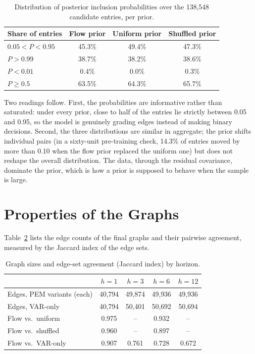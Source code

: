 \documentclass[MTech]{ugthesis}
\begin{document}
\begin{table}[htpb]
\small
\renewcommand{\arraystretch}{1.4}
\centering
\caption{Distribution of posterior inclusion probabilities over the 138,548 candidate entries, per prior.}
\label{tab:pstats}
\begin{tabular}{|p{4.2cm}|c|c|c|}
\hline
Share of entries & Flow prior & Uniform prior & Shuffled prior \\ \hline
$0.05 < P < 0.95$ & 45.3\% & 49.4\% & 47.3\% \\ \hline
$P > 0.99$ & 38.7\% & 38.2\% & 38.6\% \\ \hline
$P < 0.01$ & 0.4\% & 0.0\% & 0.3\% \\ \hline
$P \ge 0.5$ & 63.5\% & 64.3\% & 65.7\% \\ \hline
\end{tabular}
\end{table}

Two readings follow. First, the probabilities are informative rather than saturated: under every prior, close to half of the entries lie strictly between 0.05 and 0.95, so the model is genuinely grading edges instead of making binary decisions. Second, the three distributions are similar in aggregate; the prior shifts individual pairs (in a sixty-unit pre-training check, 14.3\% of entries moved by more than 0.10 when the flow prior replaced the uniform one) but does not reshape the overall distribution. The data, through the residual covariance, dominate the prior, which is how a prior is supposed to behave when the sample is large.

\section{Properties of the Graphs}
Table~\ref{tab:graphs} lists the edge counts of the final graphs and their pairwise agreement, measured by the Jaccard index of the edge sets.

\begin{table}[htpb]
\small
\renewcommand{\arraystretch}{1.4}
\centering
\caption{Graph sizes and edge-set agreement (Jaccard index) by horizon.}
\label{tab:graphs}
\begin{tabular}{|p{5.6cm}|c|c|c|c|}
\hline
 & $h=1$ & $h=3$ & $h=6$ & $h=12$ \\ \hline
Edges, PEM variants (each) & 40{,}794 & 49{,}874 & 49{,}936 & 49{,}936 \\ \hline
Edges, VAR-only & 40{,}794 & 50{,}401 & 50{,}692 & 50{,}694 \\ \hline
Flow vs.\ uniform & 0.975 & -- & 0.932 & -- \\ \hline
Flow vs.\ shuffled & 0.960 & -- & 0.897 & -- \\ \hline
Flow vs.\ VAR-only & 0.907 & 0.761 & 0.728 & 0.672 \\ \hline
\end{tabular}
\end{table}
\end{document}
